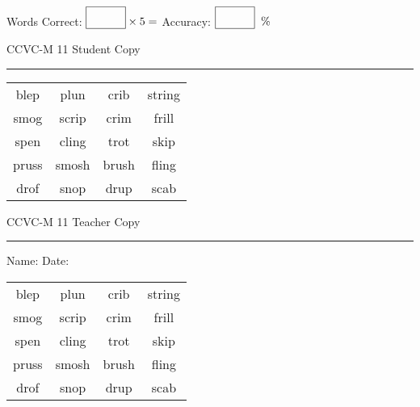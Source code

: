 \documentclass{memoir}
\begin{document}
\small

Words Correct: $\fbox{\phantom{\huge 100}} \times 5 = $ Accuracy: $\fbox{\phantom{\huge 100}}\;\; \%$ 

\vfill

\newpage


\footnotesize \noindent
CCVC-M 11 \hfill Student Copy
\smallskip
\hrule

\Large

\setlength{\tabcolsep}{14pt}
\def\arraystretch{3}

{\selectfont


\begin{vplace}[0.5]
\begin{center}
\begin{tabular}{cccc}
blep & plun & crib & string \\
smog & scrip & crim & frill \\
spen & cling & trot & skip \\
pruss       & smosh & brush & fling \\
drof & snop & drup & scab \\
\end{tabular}
\end{center}
\end{vplace}

}

\newpage

\footnotesize \noindent
CCVC-M 11 \hfill Teacher Copy
\smallskip
\hrule

\small

\vfill

\noindent
Name: \underline{\hspace{1.75in}} \hfill Date: \underline{\hspace{1in}}

\Large

{\selectfont


\begin{vplace}[0.5]
\begin{center}
\begin{tabular}{cccc}
blep & plun & crib & string \\
smog & scrip & crim & frill \\
spen & cling & trot & skip \\
pruss       & smosh & brush & fling \\
drof & snop & drup & scab \\
\end{tabular}
\end{center}
\end{vplace}



}
\end{document}

